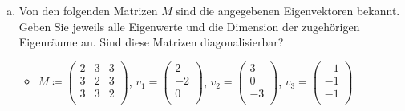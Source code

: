 \documentclass{scrreprt}
\begin{document}
\begin{enumerate}[(a)]
\newpage
\item Von den folgenden Matrizen $M$ sind die angegebenen Eigenvektoren bekannt.
  Geben Sie jeweils alle Eigenwerte und die Dimension der zugehörigen Eigenräume
  an.
  Sind diese Matrizen diagonalisierbar?
  \begin{itemize}
  \item $M \coloneqq \begin{pmatrix}
      2 & 3 & 3 \\
      3 & 2 & 3 \\
      3 & 3 & 2 \\
    \end{pmatrix}$, $v_1 = \begin{pmatrix}
      2  \\
      -2 \\
      0  \\
    \end{pmatrix}$, $v_2 = \begin{pmatrix}
      3  \\
      0  \\
      -3 \\
    \end{pmatrix}$, $v_3 = \begin{pmatrix}
      -1 \\
      -1 \\
      -1 \\
    \end{pmatrix}$


\end{itemize}
\end{enumerate}
\end{document}
